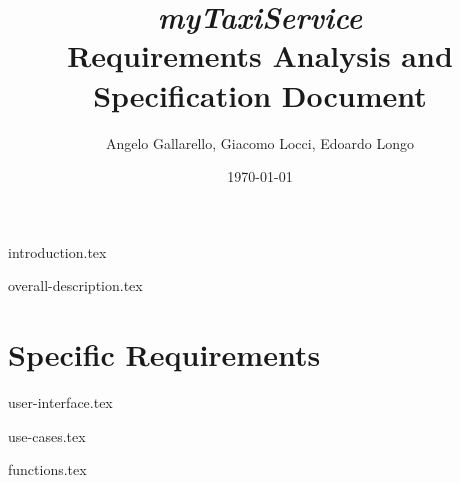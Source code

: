 \documentclass[12pt, a4paper]{article}
\begin{document}
\title{ \emph{ myTaxiService}\\ Requirements Analysis and Specification Document }

\author{Angelo Gallarello, Giacomo Locci, Edoardo Longo}
\date{\today}
\maketitle

\newpage

\tableofcontents

\newpage

{introduction.tex}

{overall-description.tex}

\newpage
\vfill
\section{Specific Requirements} %
\label{sec:specific_rquirements}

{user-interface.tex}

{use-cases.tex}

{functions.tex}
\end{document}
